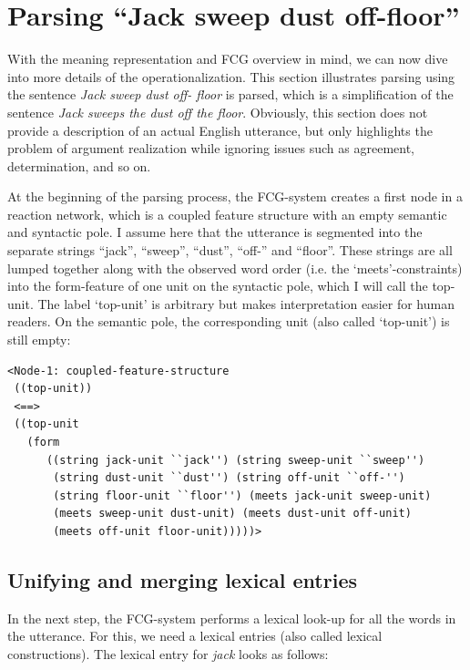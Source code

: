 \section{Parsing ``Jack sweep dust off-floor''}

With the meaning representation and FCG overview in mind, we can now dive into more details of the operationalization. This section illustrates parsing using the sentence {\em Jack sweep dust off- floor} is parsed, which is a simplification of the sentence {\em Jack sweeps the dust off the floor}. Obviously, this section does not provide a description of an actual English utterance, but only highlights the problem of argument realization while ignoring issues such as agreement, determination, and so on.

At the beginning of the parsing process, the FCG-system creates a first node in a reaction network, which is a coupled feature structure with an empty semantic and syntactic pole. I assume here that the utterance is segmented into the separate strings ``jack'', ``sweep'', ``dust'', ``off-'' and ``floor''. These strings are all lumped together along with the observed word order (i.e. the `meets'-constraints) into the form-feature of one unit on the syntactic pole, which I will call the top-unit. The label `top-unit' is arbitrary but makes interpretation easier for human readers. On  the semantic pole, the corresponding unit (also called `top-unit') is still empty:

\ea
\begin{lstlisting}
<Node-1: coupled-feature-structure
 ((top-unit))
 <==>
 ((top-unit
   (form 
      ((string jack-unit ``jack'') (string sweep-unit ``sweep'')
       (string dust-unit ``dust'') (string off-unit ``off-'')
       (string floor-unit ``floor'') (meets jack-unit sweep-unit)
       (meets sweep-unit dust-unit) (meets dust-unit off-unit)
       (meets off-unit floor-unit)))))> 
\end{lstlisting}
\z

\subsection{Unifying and merging lexical entries}
\label{s:example-parsing}

In the next step, the FCG-system performs a lexical look-up for all the words in the utterance. For this, we need a lexical entries (also called lexical constructions). The lexical entry for {\em jack} looks as follows: 

